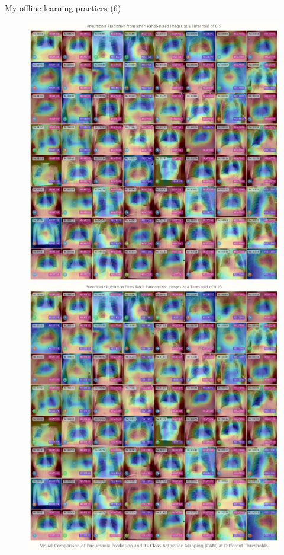 \documentclass{beamer}
\begin{document}
\begin{frame}[fragile]{My offline learning practices (6)}
	\begin{figure}[!htb]
		\vspace{-.25em}
		\endminipage\hfill
		\centering\includegraphics[width=\linewidth]{images/deep_learning_6_1_1.png}
		\endminipage\hfill
		\centering\includegraphics[width=\linewidth]{images/deep_learning_6_1_2.png}

\end{figure}
\end{frame}
\end{document}
